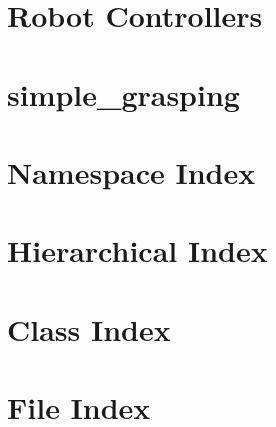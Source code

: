\let\mypdfximage\pdfximage\def\pdfximage{\immediate\mypdfximage}\documentclass[twoside]{book}
\newcommand{\+}{\discretionary{\mbox{\scriptsize$\hookleftarrow$}}{}{}}
\begin{document}
\chapter{Robot Controllers}
\label{md_submodules_robot_controllers_README}

\chapter{simple\+\_\+grasping}
\label{md_submodules_simple_grasping_README}

\chapter{Namespace Index}

\chapter{Hierarchical Index}

\chapter{Class Index}

\chapter{File Index}

\end{document}
